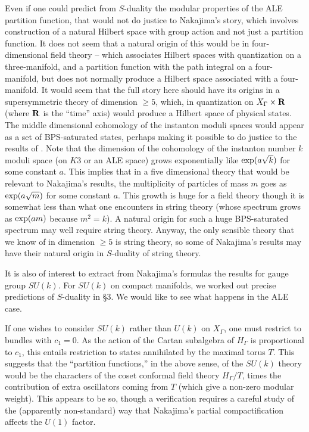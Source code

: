 \documentclass[12pt]{article}
\numberwithin{equation}{section}
\begin{document}
Even if one could predict from $S$-duality the modular properties
of the ALE partition function,
that would not do justice to Nakajima's story, which involves
construction of a natural Hilbert space with group action
and not just a partition function.  It does not seem that a natural
origin of this would be in four-dimensional field theory
-- which associates Hilbert spaces with quantization on a three-manifold,
and a partition function with the path integral on a four-manifold,
but does not normally produce a Hilbert space associated
with a four-manifold.  It would seem that the full story here
should have its origins in a supersymmetric theory of dimension $\geq 5$,
which,
in quantization on $X_\Gamma\times {\bf R}$ (where ${\bf R}$ is
the ``time'' axis) would produce a Hilbert space of physical
states.  The middle dimensional cohomology of the instanton moduli
spaces would appear as a set of BPS-saturated states,
perhaps making it
possible to do justice to the results of \cite{nakajima}.
Note that the dimension of the cohomology of the instanton number
$k$ moduli space (on $K3$ or an ALE space) grows
exponentially
like ${\rm exp}(a {\sqrt k})$ for some constant $a$.
This implies that in a five dimensional
theory that would be relevant to Nakajima's results,
the multiplicity of particles of mass $m$
goes as ${\rm exp}(a {\sqrt m})$ for some constant $a$.  This
growth is huge for a field theory though it is somewhat less than what one
encounters in string theory (whose spectrum
  grows as ${\rm exp}(a  m)$ because
$m^2=k$).  A natural origin for such a huge  BPS-saturated
spectrum may well require
string theory.  Anyway, the
only sensible theory that we know of in dimension $\geq 5$
is string theory, so some of Nakajima's
results may have their natural origin in $S$-duality of string theory.

\bigskip
{}

It is also of interest to extract from Nakajima's formulas
the results for gauge group $SU(k)$.  For $SU(k)$ on compact manifolds,
we worked out precise predictions of $S$-duality in \S3.
We would like to see what happens in the ALE case.

If one wishes to consider $SU(k)$ rather than
$U(k)$ on $X_\Gamma$, one must restrict to bundles with $c_1=0$.
As the action of the Cartan subalgebra of $H_\Gamma$ is proportional
to $c_1$, this entails restriction to states annihilated by the maximal torus
$T$.  This suggests that the ``partition functions,'' in the above
sense, of the $SU(k)$ theory would be the characters of
the coset conformal field theory $H_\Gamma/T$, times the contribution
of extra oscillators coming from $T$ (which  give a non-zero modular weight).
This appears to be
so, though a verification requires a careful study of the
(apparently non-standard) way that Nakajima's partial compactification
affects the $U(1)$ factor.
\end{document}

